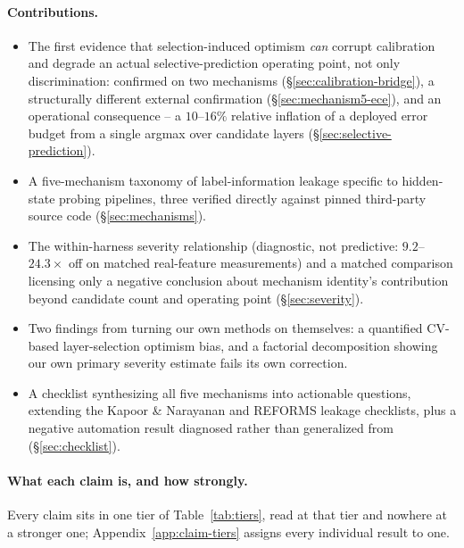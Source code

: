 \documentclass{article}
\begin{document}
\paragraph{Contributions.}
\begin{itemize}
\itemsep0pt
\item The first evidence that selection-induced optimism \emph{can} corrupt
   calibration and degrade an actual selective-prediction operating
   point, not only discrimination: confirmed on two mechanisms
   (\S\ref{sec:calibration-bridge}), a structurally different external
   confirmation (\S\ref{sec:mechanism5-ece}), and an operational
   consequence -- a $10$--$16\%$ relative inflation of a deployed error
   budget from a single argmax over candidate layers
   (\S\ref{sec:selective-prediction}).
\item A five-mechanism taxonomy of label-information leakage specific to
   hidden-state probing pipelines, three verified directly against pinned
   third-party source code (\S\ref{sec:mechanisms}).
\item The within-harness severity relationship (diagnostic, not predictive:
   $9.2$--$24.3\times$ off on matched real-feature measurements) and a
   matched comparison licensing only a negative conclusion about mechanism
   identity's contribution beyond candidate count and operating point
   (\S\ref{sec:severity}).
\item Two findings from turning our own methods on themselves: a quantified
   CV-based layer-selection optimism bias, and a factorial decomposition
   showing our own primary severity estimate fails its own correction.
\item A checklist synthesizing all five mechanisms into actionable questions,
   extending the Kapoor \& Narayanan and REFORMS leakage checklists, plus a
   negative automation result diagnosed rather than generalized from
   (\S\ref{sec:checklist}).
\end{itemize}

\paragraph{What each claim is, and how strongly.} Every claim sits in one tier
of Table~\ref{tab:tiers}, read at that tier and nowhere at a stronger one;
Appendix~\ref{app:claim-tiers} assigns every individual result to one.
\end{document}
